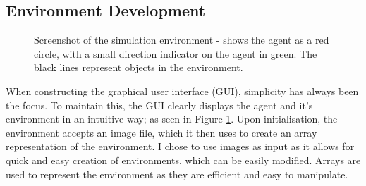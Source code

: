 \documentclass[12pt]{article}
\begin{document}
\subsection{Environment Development}
\begin{figure}[H]
    \centering
    \caption{Screenshot of the simulation environment - shows the agent as a red circle, with a small direction indicator on the agent in green. The black lines represent objects in the environment.}
    \label{fig:environment_example}
\end{figure}
When constructing the graphical user interface (GUI), simplicity has always been the focus. To maintain this, the GUI clearly displays
the agent and it's environment in an intuitive way; as seen in Figure \ref{fig:environment_example}. Upon
initialisation, the environment accepts an image file, which it then uses to create an array representation of the environment. I chose
to use images as input as it allows for quick and easy creation of environments, which can be easily modified. Arrays are used to
represent the environment as they are efficient and easy to manipulate.\\
\end{document}
